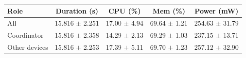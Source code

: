 \begin{tabular}{lcccc}
\hline
\textbf{Role} & \textbf{Duration (s)} & \textbf{CPU (\%)} & \textbf{Mem (\%)} & \textbf{Power (mW)} \\
\hline
All & 15.816 $\pm$ 2.251 & 17.00 $\pm$ 4.94 & 69.64 $\pm$ 1.21 & 254.63 $\pm$ 31.79 \\
Coordinator & 15.816 $\pm$ 2.358 & 14.29 $\pm$ 2.13 & 69.29 $\pm$ 1.03 & 237.15 $\pm$ 13.71 \\
Other devices & 15.816 $\pm$ 2.253 & 17.39 $\pm$ 5.11 & 69.70 $\pm$ 1.23 & 257.12 $\pm$ 32.90 \\
\hline
\end{tabular}
